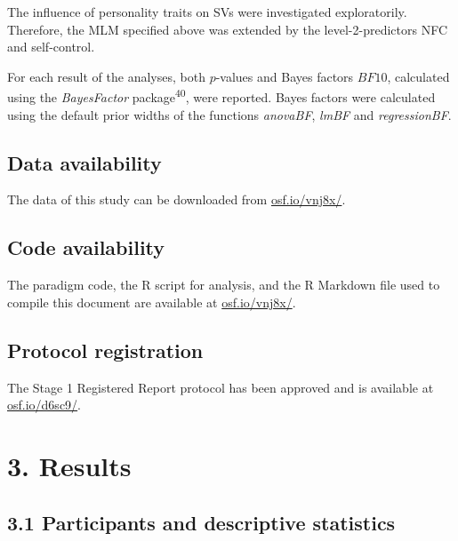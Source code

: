 \documentclass[
  man,floatsintext]{apa6}
\begin{document}
The influence of personality traits on SVs were investigated exploratorily.
Therefore, the MLM specified above was extended by the level-2-predictors NFC and self-control.

For each result of the analyses, both \(p\)-values and Bayes factors \(BF10\), calculated using the \emph{BayesFactor} package\textsuperscript{40}, were reported.
Bayes factors were calculated using the default prior widths of the functions \emph{anovaBF}, \emph{lmBF} and \emph{regressionBF}.

\hypertarget{data-availability}{%
\subsection{Data availability}\label{data-availability}}

The data of this study can be downloaded from \href{https://osf.io/vnj8x/}{osf.io/vnj8x/}.

\hypertarget{code-availability}{%
\subsection{Code availability}\label{code-availability}}

The paradigm code, the R script for analysis, and the R Markdown file used to compile this document are available at \href{https://osf.io/vnj8x/}{osf.io/vnj8x/}.

\hypertarget{protocol-registration}{%
\subsection{Protocol registration}\label{protocol-registration}}

The Stage 1 Registered Report protocol has been approved and is available at \href{https://osf.io/d6sc9/}{osf.io/d6sc9/}.

\hypertarget{results}{%
\section{3. Results}\label{results}}

\hypertarget{participants-and-descriptive-statistics}{%
\subsection{3.1 Participants and descriptive statistics}\label{participants-and-descriptive-statistics}}
\end{document}
